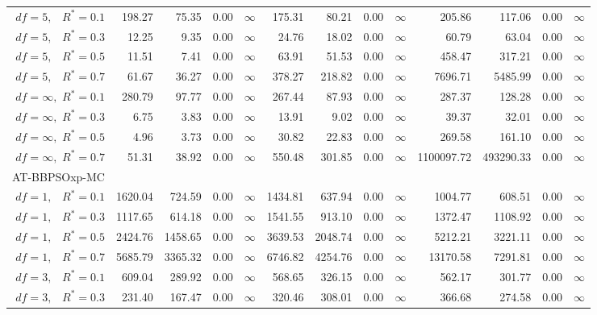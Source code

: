 \documentclass[cmbright]{staauth}
\begin{document}
\begin{table}[ht]
{\begin{tabular}{r|rrrr|rrrr|rrrr}
  $df = 5,\enspace$ $R^* =0.1$ & 198.27 & 75.35 & 0.00 & $\infty$ & 175.31 & 80.21 & 0.00 & $\infty$ & 205.86 & 117.06 & 0.00 & $\infty$ \\
  $df = 5,\enspace$ $R^* =0.3$ & 12.25 & 9.35 & 0.00 & $\infty$ & 24.76 & 18.02 & 0.00 & $\infty$ & 60.79 & 63.04 & 0.00 & $\infty$ \\
  $df = 5,\enspace$ $R^* =0.5$ & 11.51 & 7.41 & 0.00 & $\infty$ & 63.91 & 51.53 & 0.00 & $\infty$ & 458.47 & 317.21 & 0.00 & $\infty$ \\
  $df = 5,\enspace$ $R^* =0.7$ & 61.67 & 36.27 & 0.00 & $\infty$ & 378.27 & 218.82 & 0.00 & $\infty$ & 7696.71 & 5485.99 & 0.00 & $\infty$ \\
  $df = \infty,$ $R^* =0.1$ & 280.79 & 97.77 & 0.00 & $\infty$ & 267.44 & 87.93 & 0.00 & $\infty$ & 287.37 & 128.28 & 0.00 & $\infty$ \\
  $df = \infty,$ $R^* =0.3$ & 6.75 & 3.83 & 0.00 & $\infty$ & 13.91 & 9.02 & 0.00 & $\infty$ & 39.37 & 32.01 & 0.00 & $\infty$ \\
  $df = \infty,$ $R^* =0.5$ & 4.96 & 3.73 & 0.00 & $\infty$ & 30.82 & 22.83 & 0.00 & $\infty$ & 269.58 & 161.10 & 0.00 & $\infty$ \\
  $df = \infty,$ $R^* =0.7$ & 51.31 & 38.92 & 0.00 & $\infty$ & 550.48 & 301.85 & 0.00 & $\infty$ & 1100097.72 & 493290.33 & 0.00 & $\infty$ \\
\hline
\multicolumn{1}{l|}{AT-BBPSOxp-MC} &&&&&&&&&&&&\\
  $df = 1,\enspace$ $R^* =0.1$ & 1620.04 & 724.59 & 0.00 & $\infty$ & 1434.81 & 637.94 & 0.00 & $\infty$ & 1004.77 & 608.51 & 0.00 & $\infty$ \\
  $df = 1,\enspace$ $R^* =0.3$ & 1117.65 & 614.18 & 0.00 & $\infty$ & 1541.55 & 913.10 & 0.00 & $\infty$ & 1372.47 & 1108.92 & 0.00 & $\infty$ \\
  $df = 1,\enspace$ $R^* =0.5$ & 2424.76 & 1458.65 & 0.00 & $\infty$ & 3639.53 & 2048.74 & 0.00 & $\infty$ & 5212.21 & 3221.11 & 0.00 & $\infty$ \\
  $df = 1,\enspace$ $R^* =0.7$ & 5685.79 & 3365.32 & 0.00 & $\infty$ & 6746.82 & 4254.76 & 0.00 & $\infty$ & 13170.58 & 7291.81 & 0.00 & $\infty$ \\
  $df = 3,\enspace$ $R^* =0.1$ & 609.04 & 289.92 & 0.00 & $\infty$ & 568.65 & 326.15 & 0.00 & $\infty$ & 562.17 & 301.77 & 0.00 & $\infty$ \\
  $df = 3,\enspace$ $R^* =0.3$ & 231.40 & 167.47 & 0.00 & $\infty$ & 320.46 & 308.01 & 0.00 & $\infty$ & 366.68 & 274.58 & 0.00 & $\infty$ \\

\end{tabular}}
\end{table}
\end{document}
